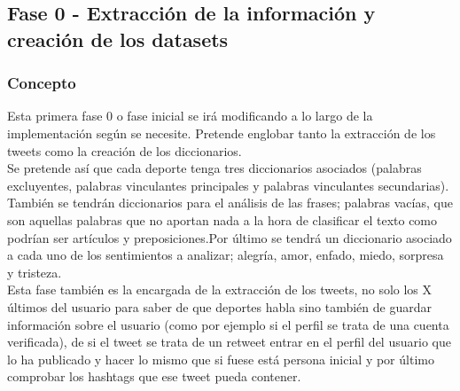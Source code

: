 \documentclass[../all.tex]{subfiles}
\begin{document}
\newpage
\subsection{Fase 0 - Extracción de la información y creación de los datasets}
    \subsubsection{Concepto}
        Esta primera fase 0 o fase inicial se irá modificando a lo largo de la implementación según se necesite. Pretende englobar tanto la extracción de los tweets como la creación de los diccionarios.\\
        
        Se pretende así que cada deporte tenga tres diccionarios asociados (palabras excluyentes, palabras vinculantes principales y palabras vinculantes secundarias). También se tendrán diccionarios para el análisis de las frases; palabras vacías, que son aquellas palabras que no aportan nada a la hora de clasificar el texto como podrían ser artículos y preposiciones.Por último se tendrá un diccionario asociado a cada uno de los sentimientos a analizar; alegría, amor, enfado, miedo, sorpresa y tristeza.\\
        
        Esta fase también es la encargada de la extracción de los tweets, no solo los X últimos del usuario para saber de que deportes habla sino también de guardar información sobre el usuario (como por ejemplo si el perfil se trata de una cuenta verificada), de si el tweet se trata de un retweet entrar en el perfil del usuario que lo ha publicado y hacer lo mismo que si fuese está persona inicial y por último comprobar los hashtags que ese tweet pueda contener.
		
    \newpage 
\end{document}
